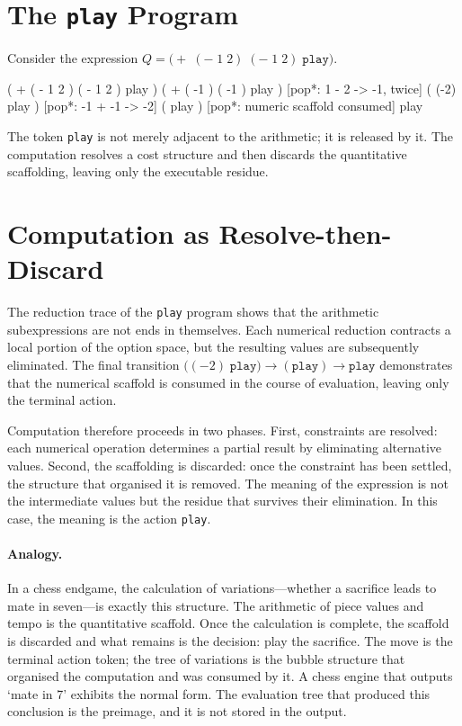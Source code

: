 \documentclass[12pt, oneside]{amsbook}
\theoremstyle{plain}
\theoremstyle{definition}
\theoremstyle{remark}
\begin{document}
\section{The \texttt{play} Program}
\label{sec:actions:play}

Consider the expression
$Q = \bigl(+\;(-\;1\;2)\;(-\;1\;2)\;\texttt{play}\bigr)$.

\begin{tcolorbox}[reduction, title={Reduction trace: the \texttt{play} program}]
( + ( - 1 2 ) ( - 1 2 ) play )
( + ( -1 ) ( -1 ) play )        [pop*: 1 - 2 -> -1, twice]
( (-2) play )                   [pop*: -1 + -1 -> -2]
( play )                        [pop*: numeric scaffold consumed]
play
\end{tcolorbox}

The token \texttt{play} is not merely adjacent to the arithmetic; it is released
by it. The computation resolves a cost structure and then discards the
quantitative scaffolding, leaving only the executable residue.

\section{Computation as Resolve-then-Discard}
\label{sec:actions:resolve}

The reduction trace of the \texttt{play} program shows that the arithmetic
subexpressions are not ends in themselves. Each numerical reduction contracts
a local portion of the option space, but the resulting values are subsequently
eliminated. The final transition
$\bigl((-2)\;\texttt{play}\bigr) \to (\texttt{play}) \to \texttt{play}$
demonstrates that the numerical scaffold is consumed in the course of
evaluation, leaving only the terminal action.

Computation therefore proceeds in two phases. First, constraints are resolved:
each numerical operation determines a partial result by eliminating alternative
values. Second, the scaffolding is discarded: once the constraint has been
settled, the structure that organised it is removed. The meaning of the
expression is not the intermediate values but the residue that survives their
elimination. In this case, the meaning is the action \texttt{play}.

\paragraph{Analogy.}
In a chess endgame, the calculation of variations---whether a sacrifice leads to mate in seven---is exactly this structure. The arithmetic of piece values and tempo is the quantitative scaffold. Once the calculation is complete, the scaffold is discarded and what remains is the decision: play the sacrifice. The move is the terminal action token; the tree of variations is the bubble structure that organised the computation and was consumed by it. A chess engine that outputs `mate in 7' exhibits the normal form. The evaluation tree that produced this conclusion is the preimage, and it is not stored in the output.
\end{document}
